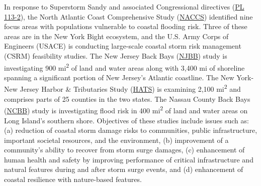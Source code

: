 \documentclass[
]{book}
\begin{document}
In response to Superstorm Sandy and associated Congressional directives (\href{https://www.congress.gov/113/plaws/publ2/PLAW-113publ2.pdf}{PL 113-2}), the North Atlantic Coast Comprehensive Study (\href{https://www.nad.usace.army.mil/CompStudy/}{NACCS}) identified nine focus areas with populations vulnerable to coastal flooding risk. Three of these areas are in the New York Bight ecosystem, and the U.S. Army Corps of Engineers (USACE) is conducting large-scale coastal storm risk management (CSRM) feasibility studies. The New Jersey Back Bays (\href{https://www.nap.usace.army.mil/Missions/Civil-Works/New-Jersey-Back-Bays-Study/}{NJBB}) study is investigating 900 mi\textsuperscript{2} of land and water areas along with 3,400 mi of shoreline spanning a significant portion of New Jersey's Atlantic coastline. The New York-New Jersey Harbor \& Tributaries Study (\href{https://www.nan.usace.army.mil/Missions/Civil-Works/Projects-in-New-York/New-York-New-Jersey-Harbor-Tributaries-Focus-Area-Feasibility-Study/}{HATS}) is examining 2,100 mi\textsuperscript{2} and comprises parts of 25 counties in the two states. The Nassau County Back Bays (\href{https://www.nap.usace.army.mil/Missions/Civil-Works/Nassau-County-Back-Bays-Study/}{NCBB}) study is investigating flood risk in 400 mi\textsuperscript{2} of land and water areas on Long Island's southern shore. Objectives of these studies include issues such as: (a) reduction of coastal storm damage risks to communities, public infrastructure, important societal resources, and the environment, (b) improvement of a community's ability to recover from storm surge damages, (c) enhancement of human health and safety by improving performance of critical infrastructure and natural features during and after storm surge events, and (d) enhancement of coastal resilience with nature-based features.
\end{document}
